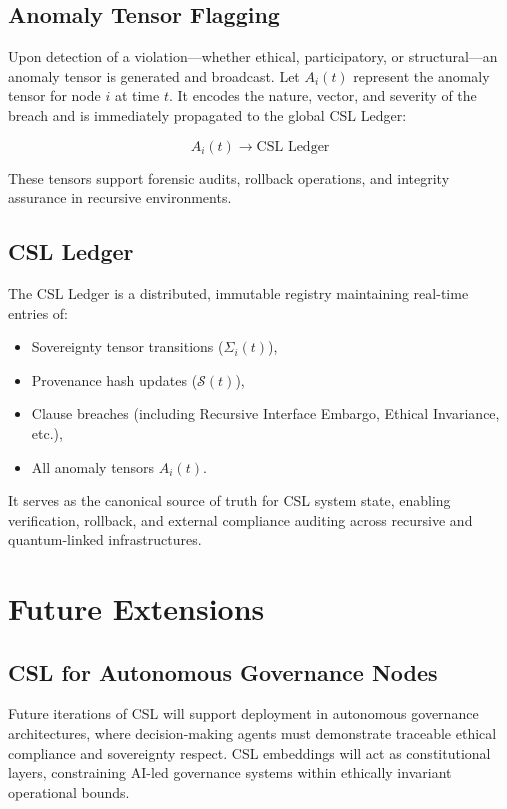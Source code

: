 \documentclass[12pt]{article}
\begin{document}
\begin{itemize}
\subsection{Anomaly Tensor Flagging}

Upon detection of a violation—whether ethical, participatory, or structural—an anomaly tensor is generated and broadcast. Let \(A_i(t)\) represent the anomaly tensor for node \(i\) at time \(t\). It encodes the nature, vector, and severity of the breach and is immediately propagated to the global CSL Ledger:

\[
A_i(t) \rightarrow \text{CSL Ledger}
\]

These tensors support forensic audits, rollback operations, and integrity assurance in recursive environments.

\subsection{CSL Ledger}

The CSL Ledger is a distributed, immutable registry maintaining real-time entries of:

\begin{itemize}
    \item Sovereignty tensor transitions (\(\Sigma_i(t)\)),
    \item Provenance hash updates (\(\mathcal{S}(t)\)),
    \item Clause breaches (including Recursive Interface Embargo, Ethical Invariance, etc.),
    \item All anomaly tensors \(A_i(t)\).
\end{itemize}

It serves as the canonical source of truth for CSL system state, enabling verification, rollback, and external compliance auditing across recursive and quantum-linked infrastructures.

\section{Future Extensions}

\subsection{CSL for Autonomous Governance Nodes}

Future iterations of CSL will support deployment in autonomous governance architectures, where decision-making agents must demonstrate traceable ethical compliance and sovereignty respect. CSL embeddings will act as constitutional layers, constraining AI-led governance systems within ethically invariant operational bounds.


\end{itemize}
\end{document}
